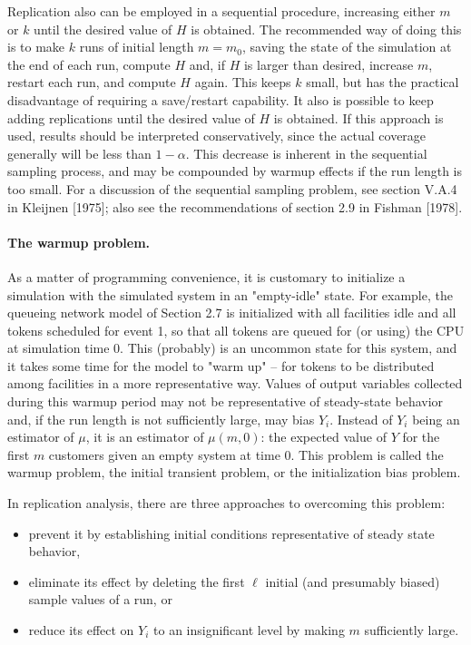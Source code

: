 Replication also can be employed in a sequential procedure, increasing either
$m$ or $k$ until the desired value of $H$ is obtained. The recommended way of
doing this is to make $k$ runs of initial length $m = m_0$, saving the state of
the simulation at the end of each run, compute $H$ and, if $H$ is larger than
desired,
\noindent increase $m$, restart each run, and compute $H$ again. This keeps $k$
small, but has the practical disadvantage of requiring a save/restart
capability. It also is possible to keep adding replications until the desired
value of $H$ is obtained. If this approach is used, results should be
interpreted conservatively, since the actual coverage generally will be less
than $1 - \alpha$. This decrease is inherent in the sequential sampling
process, and may be compounded by warmup effects if the run length is too
small. For a discussion of the sequential sampling problem, see section V.A.4
in Kleijnen [1975]; also see the recommendations of section 2.9 in Fishman
[1978].

\paragraph{The warmup problem.}
As a matter of programming convenience, it is customary to initialize a
simulation with the simulated system in an "empty-idle" state. For example,
the queueing network model of Section 2.7 is initialized with all facilities
idle and all tokens scheduled for event 1, so that all tokens are queued for
(or using) the CPU at simulation time 0. This (probably) is an uncommon state
for this system, and it takes some time for the model to "warm up" -- for
tokens to be distributed among facilities in a more representative way.
Values of output variables collected during this warmup period may not be
representative of steady-state behavior and, if the run length is not
sufficiently large, may bias $Y_i$. Instead of $Y_i$ being an estimator of
$\mu$, it is an estimator of $\mu(m,0)$: the expected value of $Y$ for the
first $m$ customers given an empty system at time 0. This problem is called
the warmup problem, the initial transient problem, or the initialization bias
problem.

In replication analysis, there are three approaches to overcoming this
problem:

\begin{itemize}
\setlength{\itemsep}{0pt}\setlength{\parskip}{0pt}
\item prevent it by establishing initial conditions representative of steady
state behavior,
\item eliminate its effect by deleting the first $\ell$ initial (and
presumably biased) sample values of a run, or
\item reduce its effect on $Y_i$ to an insignificant level by making $m$
sufficiently large.
\end{itemize}

